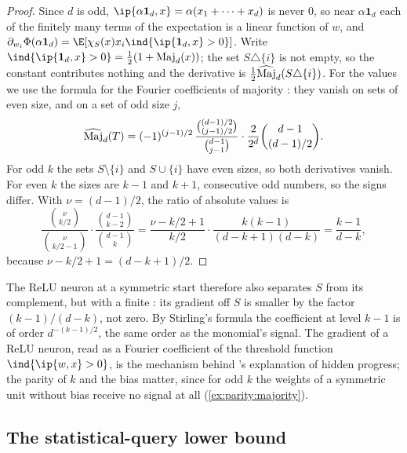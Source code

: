 \begin{refsection}
\begin{proof}
Since $d$ is odd, $\ip{\alpha\mathbf 1_d,x}=\alpha(x_1+\dots+x_d)$ is never $0$, so near $\alpha\mathbf 1_d$ each of the finitely many terms of the expectation is a linear function of $w$, and $\partial_{w_i}\Phi(\alpha\mathbf 1_d)=\E[\chi_S(x)x_i\ind\{\ip{\mathbf 1_d,x}>0\}]$. Write $\ind\{\ip{\mathbf 1_d,x}>0\}=\frac12(1+\parityMaj_d(x))$; the set $S\triangle\{i\}$ is not empty, so the constant contributes nothing and the derivative is $\frac12\widehat{\operatorname{Maj}}_d(S\triangle\{i\})$. For the values we use the formula for the Fourier coefficients of majority \parencite[Chapter~5]{ODonnell2014}: they vanish on sets of even size, and on a set of odd size $j$,
\[
  \widehat{\operatorname{Maj}}_d(T)=(-1)^{(j-1)/2}\,\frac{\binom{(d-1)/2}{(j-1)/2}}{\binom{d-1}{j-1}}\cdot\frac{2}{2^d}\binom{d-1}{(d-1)/2}.
\]
For odd $k$ the sets $S\setminus\{i\}$ and $S\cup\{i\}$ have even sizes, so both derivatives vanish. For even $k$ the sizes are $k-1$ and $k+1$, consecutive odd numbers, so the signs differ. With $\nu=(d-1)/2$, the ratio of absolute values is
\[
  \frac{\binom{\nu}{k/2}}{\binom{\nu}{k/2-1}}\cdot\frac{\binom{d-1}{k-2}}{\binom{d-1}{k}}
  =\frac{\nu-k/2+1}{k/2}\cdot\frac{k(k-1)}{(d-k+1)(d-k)}=\frac{k-1}{d-k},
\]
because $\nu-k/2+1=(d-k+1)/2$.\qedhere
\end{proof}

The ReLU neuron at a symmetric start therefore also separates $S$ from its complement, but with a finite : its gradient off $S$ is smaller by the factor $(k-1)/(d-k)$, not zero. By Stirling's formula the coefficient at level $k-1$ is of order $d^{-(k-1)/2}$, the same order as the monomial's signal. The gradient of a ReLU neuron, read as a Fourier coefficient of the threshold function $\ind\{\ip{w,x}>0\}$, is the mechanism behind \textcite{BarakEtAl2022}'s explanation of hidden progress; the parity of $k$ and the bias matter, since for odd $k$ the weights of a symmetric unit without bias receive no signal at all (\cref{ex:parity:majority}).

\subsection{The statistical-query lower bound}\label{sec:parity:sq}


\end{refsection}
